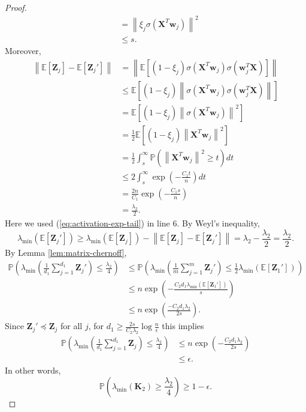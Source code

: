 \documentclass{article}
\theoremstyle{definition}
\renewcommand{\P}{\mathbb{P}}
\newcommand{\E}{\mathbb{E}}
\def\vw{{\bm{w}}}
\def\mK{{\bm{K}}}
\def\mX{{\bm{X}}}
\def\mZ{{\bm{Z}}}
\begin{document}
\begin{proof}
\begin{align*}
       &= \left\|\xi_j \sigma\left(\mX^T \vw_j\right) \right\|^2\\
       &\leq s.
   \end{align*}
   Moreover,
   \begin{align*}
       \left\|\E[\mZ_j] - \E[\mZ_j'] \right\| &= \left\|\E\left[(1 - \xi_j) \sigma\left( \mX^T \vw_j \right)\sigma\left(\vw_j^T \mX \right) \right] \right\|\\
       &\leq \E\left[(1 - \xi_j)\left\|\sigma\left( \mX^T \vw_j \right)\sigma\left(\vw_j^T \mX \right) \right\|\right]\\
       &= \E\left[(1 - \xi_j)\left\|\sigma\left(\mX^T \vw_j\right) \right\|^2 \right]\\
       &= \frac{1}{2} \E\left[(1 - \xi_j)\left\|\mX^T \vw_j \right\|^2 \right]\\
       &= \frac{1}{2}\int_{s}^{\infty}\P\left(\left\|\mX^T \vw_j\right\|^2 \geq t \right)dt\\
       &\leq 2 \int_s^{\infty}\exp\left(-\frac{C_1t}{n} \right)dt\\
       &= \frac{2n}{C_1}\exp\left(-\frac{C_1s}{n} \right)\\
       &= \frac{\lambda_2}{2}.
   \end{align*}
   Here we used (\ref{eq:activation-exp-tail}) in line 6. By Weyl's inequality,
   \[\lambda_{\min}(\E[ \mZ_j']) \geq \lambda_{\min}(\E[\mZ_j]) - \left\|\E[\mZ_j] - \E[\mZ_j']\right\| = \lambda_2 - \frac{\lambda_2}{2} = \frac{\lambda_2}{2}. \]
   By Lemma \ref{lem:matrix-chernoff},
   \begin{align*}
       \P\left(\lambda_{\min}\left(\frac{1}{d_1}\sum_{j = 1}^{d_1} \mZ_j' \right) \leq \frac{\lambda_2}{4}  \right) &\leq \P\left(\lambda_{\min}\left(\frac{1}{m}\sum_{j = 1}^m \mZ_j'\right) \leq \frac{1}{2} \lambda_{\min}(\E[\mZ_1']) \right)\\
       &\leq n \exp\left(-\frac{C_2d_1 \lambda_{\min}(\E[\mZ_1']) }{s} \right)\\
       &\leq n \exp\left(\frac{-C_2 d_1 \lambda_2  }{2s} \right).
   \end{align*}
   Since $\mZ_j' \preceq \mZ_j$ for all $j$, for $d_1 \geq \frac{2s}{C_2\lambda_2} \log \frac{n}{\epsilon}$ this implies
   \begin{align*}
       \P\left(\lambda_{\min}\left(\frac{1}{d_1}\sum_{j = 1}^{d_1}\mZ_j \right) \leq \frac{\lambda_2}{4} \right) &\leq n \exp\left(-\frac{C_2d_1 \lambda_2}{2s}\right)\\
       &\leq \epsilon.
   \end{align*}
   In other words,
    \[\P\left(\lambda_{\min}(\mK_2) \geq \frac{\lambda_2}{4}\right) \geq 1 - \epsilon. \]
\end{proof}
\end{document}
